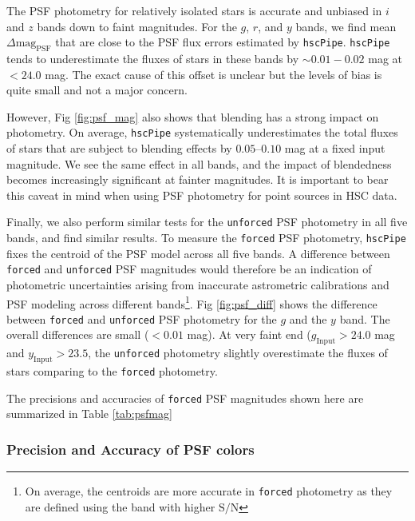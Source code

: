 \documentclass[useamsfonts]{pasj01}
\def\hscpipe{\texttt{hscPipe}}
\def\forced{\texttt{forced}}
\def\unforced{\texttt{unforced}}
\def\s2n{{$\mathrm{S}/\mathrm{N}$}}
\begin{document}

    The PSF photometry for relatively isolated stars is accurate and unbiased in $i$ 
    and $z$ bands down to faint magnitudes. 
    For the $g$, $r$, and $y$ bands, we find mean $\Delta \mathrm{mag}_{\mathrm{PSF}}$
    that are close to the PSF flux errors estimated by \hscpipe{}.  
    \hscpipe{} tends to underestimate the fluxes of stars in these bands by 
    ${\sim}0.01-0.02$ mag at $< 24.0$ mag. 
    The exact cause of this offset is unclear but the levels of bias is quite small 
    and not a major concern.  

	However, Fig \ref{fig:psf_mag} also shows that blending has a strong impact on 
	photometry.  
	On average, \hscpipe{} systematically underestimates the total fluxes of stars 
	that are subject to blending effects by $0.05$--$0.10$ mag at a fixed input 
	magnitude.
    We see the same effect in all bands, and the impact of blendedness becomes
    increasingly significant at fainter magnitudes.
    It is important to bear this caveat in mind when using PSF photometry for point
    sources in HSC data.

	Finally, we also perform similar tests for the \unforced{} PSF photometry in all 
	five bands, and find similar results. 
	To measure the \forced{} PSF photometry, \hscpipe{} fixes the centroid of the PSF 
	model across all five bands. 
	A difference between \forced{} and \unforced{} PSF magnitudes would therefore be 
	an indication of photometric uncertainties arising from inaccurate astrometric 
	calibrations and PSF modeling across different bands\footnote{On average, the 
	centroids are more accurate in \forced{} photometry as they are defined using 
	the band with higher \s2n{}}. 
	Fig \ref{fig:psf_diff} shows the difference between \forced{} and \unforced{} 
	PSF photometry for the $g$ and the $y$ band. 
	The overall differences are small ($<0.01$ mag). 
	At very faint end ($g_{\mathrm{Input}}>24.0$ mag and $y_{\mathrm{Input}}>23.5$,
	the \unforced{} photometry slightly overestimate the fluxes of stars comparing 
	to the \forced{} photometry. 
	
	The precisions and accuracies of \forced{} PSF magnitudes shown here are 
	summarized in Table \ref{tab:psfmag}

\subsubsection{Precision and Accuracy of PSF colors}
\end{document}
